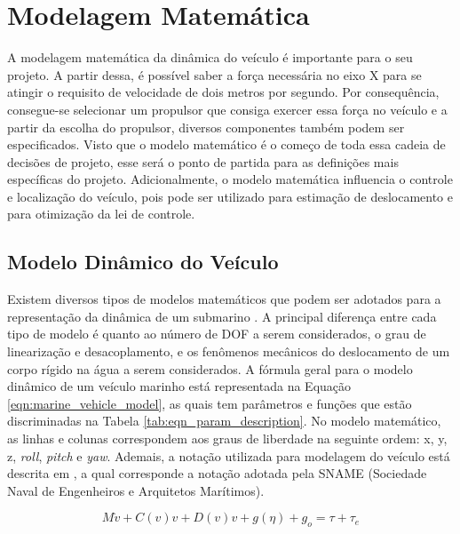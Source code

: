 \section{Modelagem Matemática}

A modelagem matemática da dinâmica do veículo é importante para o seu projeto. A partir dessa, é possível saber a força necessária no eixo X para se atingir o requisito de velocidade de dois metros por segundo. Por consequência, consegue-se selecionar um propulsor que consiga exercer essa força no veículo e a partir da escolha do propulsor, diversos componentes também podem ser especificados. Visto que o modelo matemático é o começo de toda essa cadeia de decisões de projeto, esse será o ponto de partida para as definições mais específicas do projeto. Adicionalmente, o modelo matemática influencia o controle e localização do veículo, pois pode ser utilizado para estimação de deslocamento e para otimização da lei de controle.

\subsection{Modelo Dinâmico do Veículo}

Existem diversos tipos de modelos matemáticos que podem ser adotados para a representação da dinâmica de um submarino \cite{Antonelli2018} \cite{fossen2011handbook}. A principal diferença entre cada tipo de modelo é quanto ao número de DOF a serem considerados, o grau de linearização e desacoplamento, e os fenômenos mecânicos do deslocamento de um corpo rígido na água a serem considerados. A fórmula geral para o modelo dinâmico de um veículo marinho \cite{fossen1994guidance} está representada na Equação \ref{eqn:marine_vehicle_model}, as quais tem parâmetros e funções que estão discriminadas na Tabela \ref{tab:eqn_param_description}. No modelo matemático, as linhas e colunas correspondem aos graus de liberdade na seguinte ordem: x, y, z, \textit{roll}, \textit{pitch} e \textit{yaw}. Ademais, a notação utilizada para modelagem do veículo está descrita em \cite{fossen2011handbook}, a qual corresponde a notação adotada pela SNAME (Sociedade Naval de Engenheiros e Arquitetos Marítimos).

\begin{equation}
	\label{eqn:marine_vehicle_model}
	M\dot{v} + C(v)v + D(v)v + g(\eta) + g_o = \tau + \tau_{e}
\end{equation}

